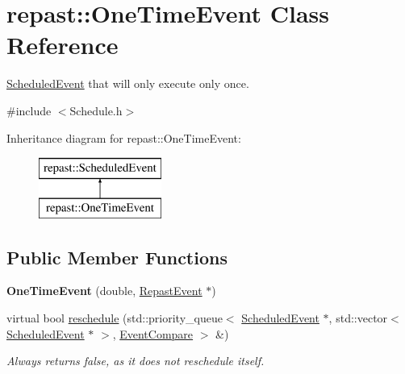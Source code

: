\hypertarget{classrepast_1_1_one_time_event}{\section{repast\-:\-:One\-Time\-Event Class Reference}
\label{classrepast_1_1_one_time_event}
}


\hyperlink{classrepast_1_1_scheduled_event}{Scheduled\-Event} that will only execute only once.  




{\ttfamily \#include $<$Schedule.\-h$>$}

Inheritance diagram for repast\-:\-:One\-Time\-Event\-:\begin{figure}[H]
\begin{center}
\leavevmode
\includegraphics[height=2.000000cm]{classrepast_1_1_one_time_event}
\end{center}
\end{figure}
\subsection*{Public Member Functions}
\begin{DoxyCompactItemize}
\item 
\hypertarget{classrepast_1_1_one_time_event_aa5e82b975901d00868417645b66bbc71}{{\bfseries One\-Time\-Event} (double, \hyperlink{classrepast_1_1_repast_event}{Repast\-Event} $\ast$)}\label{classrepast_1_1_one_time_event_aa5e82b975901d00868417645b66bbc71}

\item 
\hypertarget{classrepast_1_1_one_time_event_a015c78426a9c7bc7de042d66b4387ecb}{virtual bool \hyperlink{classrepast_1_1_one_time_event_a015c78426a9c7bc7de042d66b4387ecb}{reschedule} (std\-::priority\-\_\-queue$<$ \hyperlink{classrepast_1_1_scheduled_event}{Scheduled\-Event} $\ast$, std\-::vector$<$ \hyperlink{classrepast_1_1_scheduled_event}{Scheduled\-Event} $\ast$ $>$, \hyperlink{classrepast_1_1_event_compare}{Event\-Compare} $>$ \&)}\label{classrepast_1_1_one_time_event_a015c78426a9c7bc7de042d66b4387ecb}

\begin{DoxyCompactList}\small\item\em Always returns false, as it does not reschedule itself. \end{DoxyCompactList}\end{DoxyCompactItemize}
